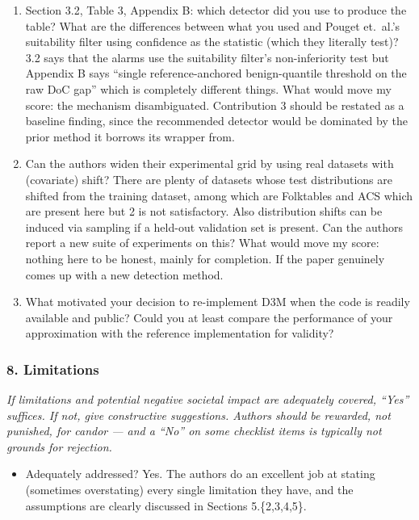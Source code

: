 \begin{enumerate}
  \item Section 3.2, Table 3, Appendix B: which detector did you use to
  produce the table? What are the differences between what you used and Pouget
  et.\ al.'s suitability filter using confidence as the statistic (which they
  literally test)? 3.2 says that the alarms use the suitability filter's
  non-inferiority test but Appendix B says ``single reference-anchored
  benign-quantile threshold on the raw DoC gap'' which is completely different
  things. What would move my score: the mechanism disambiguated. Contribution 3
  should be restated as a baseline finding, since the recommended detector
  would be dominated by the prior method it borrows its wrapper from.
  \item Can the authors widen their experimental grid by using real datasets
  with (covariate) shift? There are plenty of datasets whose test distributions
  are shifted from the training dataset, among which are Folktables and ACS
  which are present here but 2 is not satisfactory. Also distribution shifts
  can be induced via sampling if a held-out validation set is present. Can the
  authors report a new suite of experiments on this? What would move my score:
  nothing here to be honest, mainly for completion. If the paper genuinely
  comes up with a new detection method.
  \item What motivated your decision to re-implement D3M when the code is
  readily available and public? Could you at least compare the performance of
  your approximation with the reference implementation for validity?
\end{enumerate}

\subsubsection*{8. Limitations}
{\itshape If limitations and potential negative societal impact are adequately
covered, ``Yes'' suffices. If not, give constructive suggestions. Authors
should be rewarded, not punished, for candor --- and a ``No'' on some checklist
items is typically not grounds for rejection.}

\begin{itemize}
  \item Adequately addressed? Yes. The authors do an excellent job at stating
  (sometimes overstating) every single limitation they have, and the
  assumptions are clearly discussed in Sections 5.\{2,3,4,5\}.
\end{itemize}

